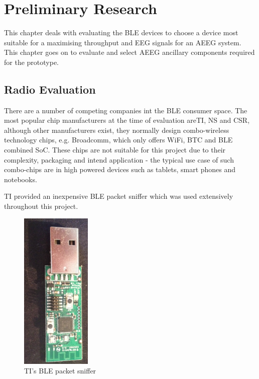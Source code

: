 \documentclass[]{article}
\begin{document}
\clearpage

\section{Preliminary Research}

This chapter deals with evaluating the \ac{BLE} devices to choose a device most suitable for a maximising throughput and \ac{EEG} signals for an \ac{AEEG} system. This chapter goes on to evaluate and select \ac{AEEG} ancillary components required for the prototype.

\subsection{Radio Evaluation}

There are a number of competing companies int the \ac{BLE} consumer space. The most popular chip manufacturers at the time of evaluation are\ac{TI}, \ac{NS} and \ac{CSR}, although  other manufacturers exist, they normally design combo-wireless technology chips, e.g. Broadcomm, which only offers WiFi, \ac{BTC} and \ac{BLE} combined \ac{SoC}. These chips are not suitable for this project due to their complexity, packaging and intend application - the typical use case of such combo-chips are in high powered devices such as tablets, smart phones and notebooks. 

\ac{TI} provided an inexpensive \ac{BLE} packet sniffer which was used extensively throughout this project.

\begin{figure}[h]
	\begin{center}
		\includegraphics[width = 0.3\textwidth, angle = 90]{sniffer.png}
	\end{center}
	\caption{\ac{TI}'s \ac{BLE} packet sniffer }
	\label{fig:sniffer}
\end{figure}
\end{document}

